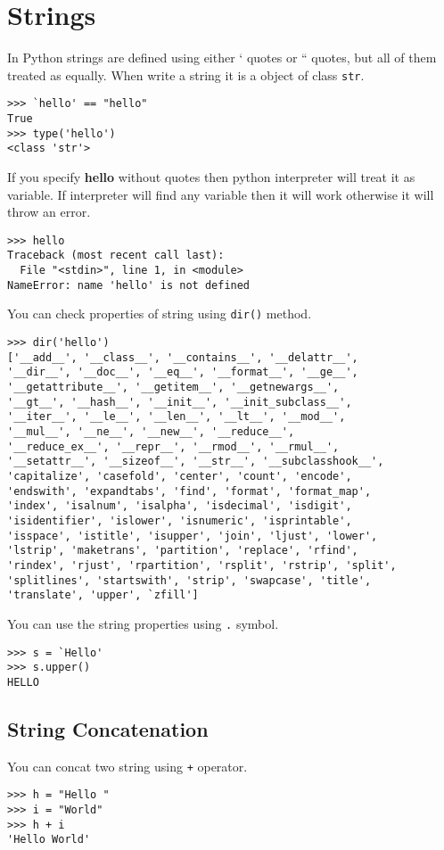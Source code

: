 \documentclass[letterpaper,12pt]{book}
\begin{document}
\section{Strings}
In Python strings are defined using either ` quotes or `` quotes, but all of them treated as equally. When write a string it is a object of class \texttt{str}. 
\begin{verbatim}
>>> `hello' == "hello"
True
>>> type('hello')
<class 'str'>
\end{verbatim}
If you specify \textbf{hello} without quotes then python interpreter will treat it as variable. If interpreter will find any variable then it will work otherwise it will throw an error.
\begin{verbatim}
>>> hello
Traceback (most recent call last):
  File "<stdin>", line 1, in <module>
NameError: name 'hello' is not defined
\end{verbatim}
You can check properties of string using \texttt{dir()} method.
\begin{verbatim}
>>> dir('hello')
['__add__', '__class__', '__contains__', '__delattr__', 
'__dir__', '__doc__', '__eq__', '__format__', '__ge__', 
'__getattribute__', '__getitem__', '__getnewargs__', 
'__gt__', '__hash__', '__init__', '__init_subclass__', 
'__iter__', '__le__', '__len__', '__lt__', '__mod__', 
'__mul__', '__ne__', '__new__', '__reduce__', 
'__reduce_ex__', '__repr__', '__rmod__', '__rmul__', 
'__setattr__', '__sizeof__', '__str__', '__subclasshook__',
'capitalize', 'casefold', 'center', 'count', 'encode',
'endswith', 'expandtabs', 'find', 'format', 'format_map',
'index', 'isalnum', 'isalpha', 'isdecimal', 'isdigit',
'isidentifier', 'islower', 'isnumeric', 'isprintable',
'isspace', 'istitle', 'isupper', 'join', 'ljust', 'lower',
'lstrip', 'maketrans', 'partition', 'replace', 'rfind',
'rindex', 'rjust', 'rpartition', 'rsplit', 'rstrip', 'split',
'splitlines', 'startswith', 'strip', 'swapcase', 'title',
'translate', 'upper', `zfill']
\end{verbatim}
You can use the string properties using \texttt{.} symbol.
\begin{verbatim}
>>> s = `Hello'
>>> s.upper()
HELLO
\end{verbatim}
\subsection{String Concatenation}
You can concat two string using \texttt{+} operator.
\begin{verbatim}
>>> h = "Hello "
>>> i = "World"
>>> h + i
'Hello World'
\end{verbatim}
\end{document}
